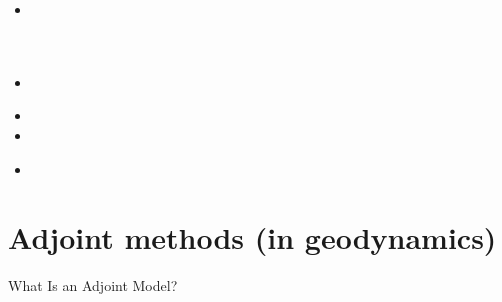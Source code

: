 \begin{scriptsize}
\begin{itemize}
\item[\twothousandtwenty] 
 \\
 \\
 \\
\item[\twothousandtwentyone] 
 \\
\item[\twothousandtwentytwo] 
\item[\twothousandtwentythree] 
\item[\twothousandtwentyfour] 
 \\
\end{itemize}
\end{scriptsize}



\section{Adjoint methods (in geodynamics)}

What Is an Adjoint Model? \cite{erri97}

